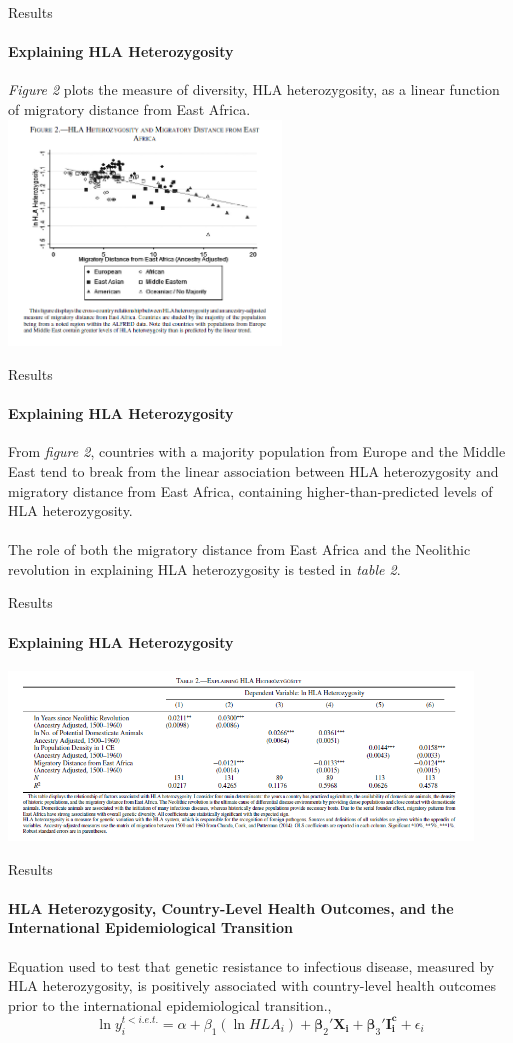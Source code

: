 \documentclass[pdftex,12pt,xcolor=pdftex,table]{beamer}
\theoremstyle{definition}
\theoremstyle{remark}
\numberwithin{equation}{section}
\numberwithin{figure}{section}
\begin{document}
\begin{frame}{Results}
\framesubtitle{Explaining HLA Heterozygosity}
\justifying
\textit{Figure 2} plots the measure of diversity, HLA heterozygosity, as a linear function of migratory distance from East Africa. 
\\ 
\includegraphics[height=6cm]{Figure_2.PNG}
\centering
\end{frame}



\begin{frame}{Results}
\framesubtitle{Explaining HLA Heterozygosity}
\justifying
From \textit{figure 2}, countries with a majority population from Europe and the Middle East tend to break from the linear association between HLA heterozygosity and migratory distance from East Africa, containing higher-than-predicted levels of HLA heterozygosity.\\~\\
The role of both the migratory distance from East Africa and the Neolithic revolution in explaining HLA heterozygosity is tested in \textit{table 2}.
\end{frame}

\begin{frame}{Results}
\framesubtitle{Explaining HLA Heterozygosity}
\justifying
\includegraphics[height=4.5cm]{Table_2.PNG}
\end{frame}




\begin{frame}{Results}
\framesubtitle{HLA Heterozygosity, Country-Level Health Outcomes, and the International Epidemiological Transition}
\justifying
Equation used to test that genetic resistance to infectious disease, measured by HLA heterozygosity, is positively associated with country-level health outcomes prior to the international epidemiological transition.,
\begin{equation}
    \ln y_{i}^{t<i.e.t.}=\alpha+\beta_{1}(\ln HLA_{i})+\boldsymbol{\beta}_{2}'\mathbf{X_{i}}+\boldsymbol{\beta}_{3}'\mathbf{I_{i}^{c}}+\epsilon_{i}
\end{equation}

\end{frame}
\end{document}
